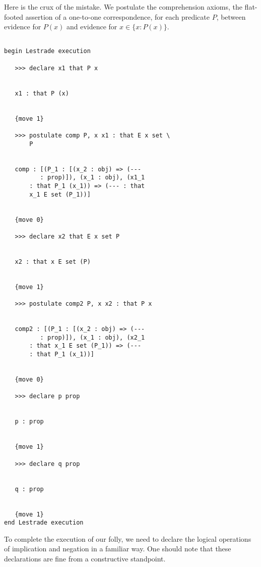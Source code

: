 \documentclass[12pt]{article}
\begin{document}
Here is the crux of the mistake.  We postulate the comprehension axioms, the flat-footed assertion of a one-to-one correspondence, for each predicate $P$, between evidence
for $P(x)$ and evidence for $x \in \{x:P(x)\}$.

\begin{verbatim}

begin Lestrade execution

   >>> declare x1 that P x


   x1 : that P (x)


   {move 1}

   >>> postulate comp P, x x1 : that E x set \
       P


   comp : [(P_1 : [(x_2 : obj) => (--- 
          : prop)]), (x_1 : obj), (x1_1 
       : that P_1 (x_1)) => (--- : that 
       x_1 E set (P_1))]


   {move 0}

   >>> declare x2 that E x set P


   x2 : that x E set (P)


   {move 1}

   >>> postulate comp2 P, x x2 : that P x


   comp2 : [(P_1 : [(x_2 : obj) => (--- 
          : prop)]), (x_1 : obj), (x2_1 
       : that x_1 E set (P_1)) => (--- 
       : that P_1 (x_1))]


   {move 0}

   >>> declare p prop


   p : prop


   {move 1}

   >>> declare q prop


   q : prop


   {move 1}
end Lestrade execution
\end{verbatim}

To complete the execution of our folly, we need to declare the logical operations of implication and negation in a familiar way.  One should note that these declarations  are fine from a constructive standpoint.
\end{document}
